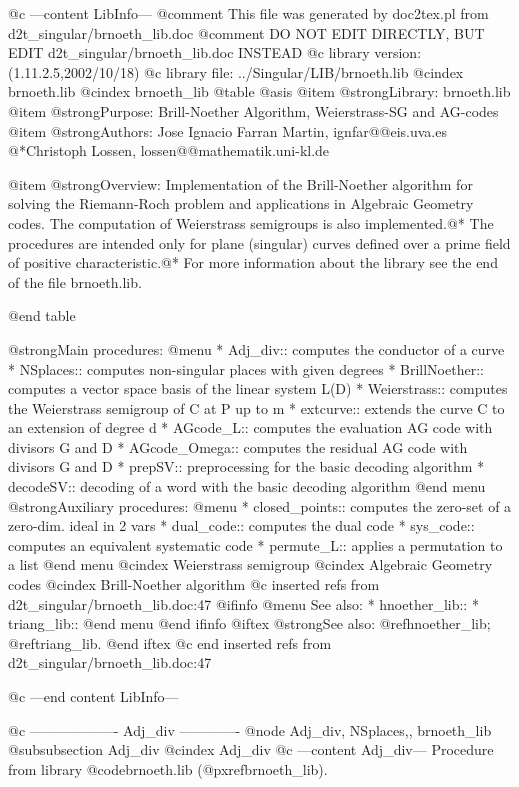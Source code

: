 @c ---content LibInfo---
@comment This file was generated by doc2tex.pl from d2t_singular/brnoeth_lib.doc
@comment DO NOT EDIT DIRECTLY, BUT EDIT d2t_singular/brnoeth_lib.doc INSTEAD
@c library version: (1.11.2.5,2002/10/18)
@c library file: ../Singular/LIB/brnoeth.lib
@cindex brnoeth.lib
@cindex brnoeth_lib
@table @asis
@item @strong{Library:}
brnoeth.lib
@item @strong{Purpose:}
  Brill-Noether Algorithm, Weierstrass-SG and AG-codes
@item @strong{Authors:}
Jose Ignacio Farran Martin, ignfar@@eis.uva.es
@*Christoph Lossen, lossen@@mathematik.uni-kl.de

@item @strong{Overview:}
Implementation of the Brill-Noether algorithm for solving the
Riemann-Roch problem and applications in Algebraic Geometry codes.
The computation of Weierstrass semigroups is also implemented.@*
The procedures are intended only for plane (singular) curves defined over
a prime field of positive characteristic.@*
For more information about the library see the end of the file brnoeth.lib.

@end table

@strong{Main procedures:}
@menu
* Adj_div:: computes the conductor of a curve
* NSplaces:: computes non-singular places with given degrees
* BrillNoether:: computes a vector space basis of the linear system L(D)
* Weierstrass:: computes the Weierstrass semigroup of C at P up to m
* extcurve:: extends the curve C to an extension of degree d
* AGcode_L:: computes the evaluation AG code with divisors G and D
* AGcode_Omega:: computes the residual AG code with divisors G and D
* prepSV:: preprocessing for the basic decoding algorithm
* decodeSV:: decoding of a word with the basic decoding algorithm
@end menu
@strong{Auxiliary procedures:}
@menu
* closed_points:: computes the zero-set of a zero-dim. ideal in 2 vars
* dual_code:: computes the dual code
* sys_code:: computes an equivalent systematic code
* permute_L:: applies a permutation to a list
@end menu
@cindex Weierstrass semigroup
@cindex Algebraic Geometry codes
@cindex Brill-Noether algorithm
@c inserted refs from d2t_singular/brnoeth_lib.doc:47
@ifinfo
@menu
See also:
* hnoether_lib::
* triang_lib::
@end menu
@end ifinfo
@iftex
@strong{See also:}
@ref{hnoether_lib};
@ref{triang_lib}.
@end iftex
@c end inserted refs from d2t_singular/brnoeth_lib.doc:47

@c ---end content LibInfo---

@c ------------------- Adj_div -------------
@node Adj_div, NSplaces,, brnoeth_lib
@subsubsection Adj_div
@cindex Adj_div
@c ---content Adj_div---
Procedure from library @code{brnoeth.lib} (@pxref{brnoeth_lib}).

